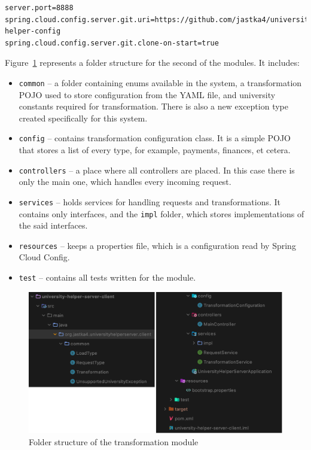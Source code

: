 \begin{lstlisting}[label=list:spring-cloud-config-properties,caption=Spring Cloud Config properties, basicstyle=\footnotesize\ttfamily]
server.port=8888
spring.cloud.config.server.git.uri=https://github.com/jastka4/university-helper-config
spring.cloud.config.server.git.clone-on-start=true
\end{lstlisting}

Figure~\ref{fig:server-client-folder-structure} represents a folder structure for the second of the modules. It includes:
\begin{itemize}
    \item \texttt{common} -- a folder containing enums available in the system, a transformation POJO used to store configuration from the YAML file, and university constants required for transformation. There is also a new exception type created specifically for this system.
    \item\texttt{config} -- contains transformation configuration class. It is a simple POJO that stores a list of every type, for example, payments, finances, et cetera.
    \item \texttt{controllers} -- a place where all controllers are placed. In this case there is only the main one, which handles every incoming request.
    \item \texttt{services} -- holds services for handling requests and transformations. It contains only interfaces, and the \texttt{impl} folder, which stores implementations of the said interfaces.
    \item \texttt{resources} -- keeps a properties file, which is a configuration read by Spring Cloud Config.
    \item \texttt{test} -- contains all tests written for the module.
\end{itemize}
\begin{figure}[b]
    \centering
    \includegraphics[width=.75\linewidth]{fig04/server-client-folder-structure.png}
    \caption{Folder structure of the transformation module}
    \label{fig:server-client-folder-structure}
\end{figure}

